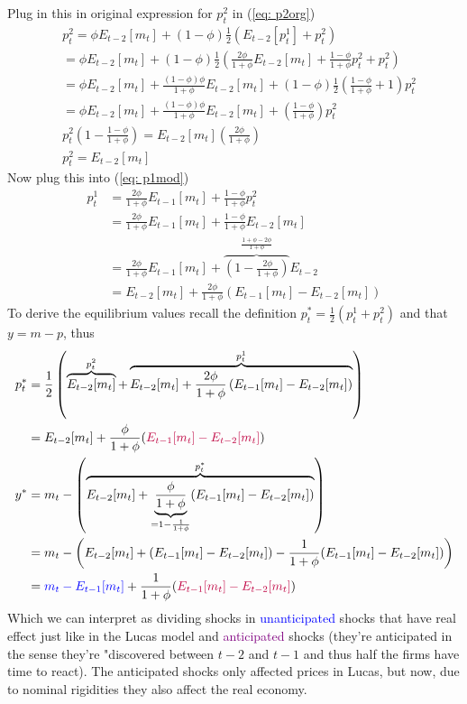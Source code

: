 \documentclass[12pt, a4paper]{article}
\begin{document}
\begin{spacing}{1.213}
Plug in this in original expression for $p_t^2$ in (\ref{eq: p2org})
\begin{align*}
&p_t^2 = \phi E_{t-2}[m_t] + (1-\phi) \frac{1}{2} (E_{t-2}[p_t^1] + p_t^2) \\
& = \phi E_{t-2}[m_t] + (1-\phi) \frac{1}{2} \left( \frac{2\phi}{1+\phi} E_{t-2}[m_t] + \frac{1-\phi}{1+\phi} p_t^2 + p_t^2\right) \\
& = \phi E_{t-2}[m_t] +  \frac{(1-\phi)\phi}{1+\phi} E_{t-2}[m_t] + (1-\phi) \frac{1}{2}\left( \frac{1-\phi}{1+\phi}+1 \right) p_t^2 \\
& = \phi E_{t-2}[m_t] +  \frac{(1-\phi)\phi}{1+\phi} E_{t-2}[m_t] +\left( \frac{1-\phi}{1+\phi} \right) p_t^2 \\
&p_t^2 \left(1- \frac{1-\phi}{1+\phi} \right) = E_{t-2}[m_t]\left( \frac{2\phi}{1+ \phi} \right) \\
&p_t^2 = E_{t-2}[m_t]
\end{align*}
Now plug this into (\ref{eq: p1mod})
\begin{align*}
 p_t^1 &= \frac{2\phi}{1+\phi} E_{t-1}[m_t] + \frac{1-\phi}{1+\phi} p_t^2 \\
&  = \frac{2\phi}{1+\phi} E_{t-1}[m_t] + \frac{1-\phi}{1+\phi} E_{t-2}[m_t] \\
& = \frac{2\phi}{1+\phi} E_{t-1}[m_t] + \overbrace{\left(1 - \frac{2\phi}{1+ \phi} \right)}^{\frac{1+\phi-2\phi}{1+\phi}}  E_{t-2}\\
& = E_{t-2}[m_t] + \frac{2\phi}{1+\phi} \left( E_{t-1}[m_t] - E_{t-2}[m_t] \right)
\end{align*}
To derive the equilibrium values recall the definition $p^*_t = \frac{1}{2}(p_t^1 + p_t^2)$ and that $y = m-p$, thus
\begin{align*}
p_t^* &= \frac{1}{2} \left(\overbrace{E_{t-2}[m_t]}^{p_t^2} + \overbrace{ E_{t-2}[m_t] + \frac{2\phi}{1+\phi} \left( E_{t-1}[m_t] - E_{t-2}[m_t] \right)}^{p_t^1} \right)
\\
& = E_{t-2}[m_t] + \frac{\phi}{1+\phi} (\textcolor{purple}{ E_{t-1}[m_t] - E_{t-2}[m_t]})
\\
y^* &= m_t - \left( \overbrace{E_{t-2}[m_t]  + \underbrace{\frac{\phi}{1+\phi}}_{=1-\frac{1}{1+\phi}} (E_{t-1}[m_t] - E_{t-2}[m_t])}^{p_t^*} \right)
\\
& = m_t  - \left( E_{t-2}[m_t] + (E_{t-1}[m_t] -E_{t-2}[m_t]) - \frac{1}{1+\phi}(E_{t-1}[m_t] - E_{t-2}[m_t])
\right)
\\
& = \textcolor{blue}{m_t - E_{t-1}[m_t]} + \frac{1}{1+ \phi}(\textcolor{purple}{E_{t-1}[m_t] -E_{t-2}[m_t]})
\end{align*}
Which we can interpret as dividing shocks in \textcolor{blue}{unanticipated} shocks that have real effect just like in the Lucas model and \textcolor{purple}{anticipated} shocks (they're anticipated in the sense they're "discovered between $t-2$ and $t-1$ and thus half the firms have time to react). The anticipated shocks only affected prices in Lucas, but now, due to nominal rigidities they also affect the real economy.


\end{spacing}
\end{document}
